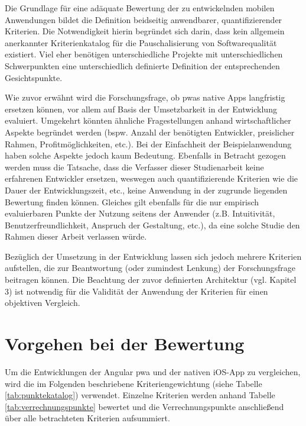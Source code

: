 Die Grundlage für eine adäquate Bewertung der zu entwickelnden mobilen Anwendungen bildet die Definition beidseitig anwendbarer, quantifizierender Kriterien. Die Notwendigkeit hierin begründet sich darin, dass kein allgemein anerkannter Kriterienkatalog für die Pauschalisierung von Softwarequalität existiert. Viel eher benötigen unterschiedliche Projekte mit unterschiedlichen Schwerpunkten eine unterschiedlich definierte Definition der entsprechenden Gesichtspunkte.

Wie zuvor erwähnt wird die Forschungsfrage, ob \acp{pwa} native Apps langfristig ersetzen können, vor allem auf Basis der Umsetzbarkeit in der Entwicklung evaluiert. Umgekehrt könnten ähnliche Fragestellungen anhand wirtschaftlicher Aspekte begründet werden (bspw. Anzahl der benötigten Entwickler, preislicher Rahmen, Profitmöglichkeiten, etc.). Bei der Einfachheit der Beispielanwendung haben solche Aspekte jedoch kaum Bedeutung. Ebenfalls in Betracht gezogen werden muss die Tatsache, dass die Verfasser dieser Studienarbeit keine erfahrenen Entwickler ersetzen, weswegen auch quantifizierende Kriterien wie die Dauer der Entwicklungszeit, etc., keine Anwendung in der zugrunde liegenden Bewertung finden können. Gleiches gilt ebenfalls für die nur empirisch evaluierbaren Punkte der Nutzung seitens der Anwender (z.B. Intuitivität, Benutzerfreundlichkeit, Anspruch der Gestaltung, etc.), da eine solche Studie den Rahmen dieser Arbeit verlassen würde.

Bezüglich der Umsetzung in der Entwicklung lassen sich jedoch mehrere Kriterien aufstellen, die zur Beantwortung (oder zumindest Lenkung) der Forschungsfrage beitragen können. Die Beachtung der zuvor definierten Architektur (vgl. Kapitel 3) ist notwendig für die Validität der Anwendung der Kriterien für einen objektiven Vergleich.

\section{Vorgehen bei der Bewertung}
Um die Entwicklungen der Angular \ac{pwa} und der nativen iOS-App zu vergleichen, wird die im Folgenden beschriebene Kriteriengewichtung (siehe Tabelle \ref{tab:punktekatalog}) verwendet. Einzelne Kriterien werden anhand Tabelle \ref{tab:verrechnungspunkte} bewertet und die Verrechnungspunkte anschließend über alle betrachteten Kriterien aufsummiert.

